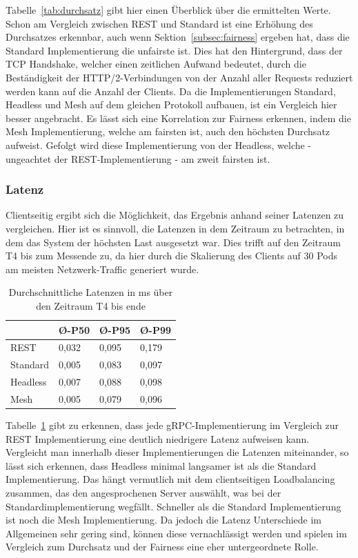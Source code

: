 Tabelle~\ref{tab:durchsatz} gibt hier einen Überblick über die ermittelten Werte.
Schon am Vergleich zwischen REST und Standard ist eine Erhöhung des Durchsatzes erkennbar, auch wenn Sektion~\ref{subsec:fairness} ergeben hat, dass die Standard Implementierung die unfairste ist.
Dies hat den Hintergrund, dass der TCP Handshake, welcher einen zeitlichen Aufwand bedeutet, durch die Beständigkeit der HTTP/2-Verbindungen von der Anzahl aller Requests reduziert werden kann auf die Anzahl der Clients.
Da die Implementierungen Standard, Headless und Mesh auf dem gleichen Protokoll aufbauen, ist ein Vergleich hier besser angebracht.
Es lässt sich eine Korrelation zur Fairness erkennen, indem die Mesh Implementierung, welche am fairsten ist, auch den höchsten Durchsatz aufweist.
Gefolgt wird diese Implementierung von der Headless, welche - ungeachtet der REST-Implementierung - am zweit fairsten ist.

\subsubsection{Latenz}
Clientseitig ergibt sich die Möglichkeit, das Ergebnis anhand seiner Latenzen zu vergleichen.
Hier ist es sinnvoll, die Latenzen in dem Zeitraum zu betrachten, in dem das System der höchsten Last ausgesetzt war.
Dies trifft auf den Zeitraum T4 bis zum Messende zu, da hier durch die Skalierung des Clients auf 30 Pods am meisten Netzwerk-Traffic generiert wurde.

\begin{table}[H]
    \centering
    \begin{tabular}{|l|l|l|l|}
        \hline
        & Ø-P50 & Ø-P95 & Ø-P99 \\ \hline
        REST     & 0,032 & 0,095 & 0,179 \\ \hline
        Standard & 0,005 & 0,083 & 0,097 \\ \hline
        Headless & 0,007 & 0,088 & 0,098 \\ \hline
        Mesh     & 0,005 & 0,079 & 0,096 \\ \hline
    \end{tabular}
    \caption{Durchschnittliche Latenzen in ms über den Zeitraum T4 bis ende}
    \label{tab:latenz}
\end{table}

Tabelle~\ref{tab:latenz} gibt zu erkennen, dass jede gRPC-Implementierung im Vergleich zur REST Implementierung eine deutlich niedrigere Latenz aufweisen kann.
Vergleicht man innerhalb dieser Implementierungen die Latenzen miteinander, so lässt sich erkennen, dass Headless minimal langsamer ist als die Standard Implementierung.
Das hängt vermutlich mit dem clientseitigen Loadbalancing zusammen, das den angesprochenen Server auswählt, was bei der Standardimplementierung wegfällt.
Schneller als die Standard Implementierung ist noch die Mesh Implementierung.
Da jedoch die Latenz Unterschiede im Allgemeinen sehr gering sind, können diese vernachlässigt werden und spielen im Vergleich zum Durchsatz und der Fairness eine eher untergeordnete Rolle.

